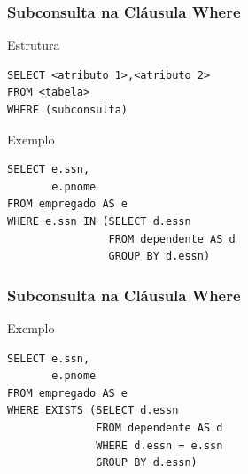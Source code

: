 \documentclass{beamer}
\begin{document}
\begin{frame}[fragile]
\frametitle{Subconsulta na Cláusula Where}

\begin{block}{Estrutura}
	\begin{lstlisting}
SELECT <atributo 1>,<atributo 2>
FROM <tabela>
WHERE (subconsulta)	
	\end{lstlisting}
\end{block}\vfill

\begin{exampleblock}{Exemplo}
	\begin{lstlisting}
SELECT e.ssn,
       e.pnome
FROM empregado AS e
WHERE e.ssn IN (SELECT d.essn
                FROM dependente AS d
                GROUP BY d.essn)	
	\end{lstlisting}
\end{exampleblock}
\end{frame}

\begin{frame}[fragile]
\frametitle{Subconsulta na Cláusula Where}

\begin{exampleblock}{Exemplo}
	\begin{lstlisting}
SELECT e.ssn,
       e.pnome
FROM empregado AS e
WHERE EXISTS (SELECT d.essn
              FROM dependente AS d
              WHERE d.essn = e.ssn
              GROUP BY d.essn)
	\end{lstlisting}
\end{exampleblock}
\end{frame}
\end{document}
